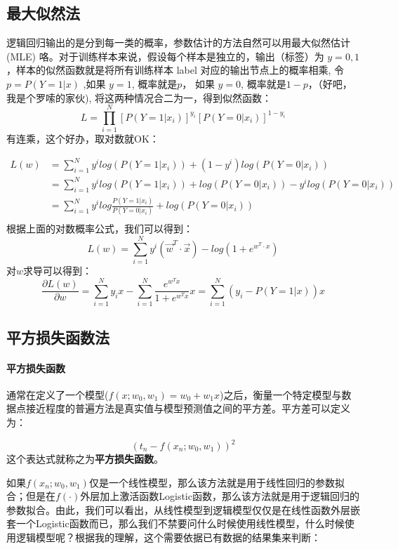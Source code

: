 \documentclass[a4paper, 11pt, hyperref, UTF8]{ctexart} %
\begin{document}
\subsection{最大似然法}

逻辑回归输出的是分到每一类的概率，参数估计的方法自然可以用最大似然估计 (MLE) 咯。对于训练样本来说，假设每个样本是独立的，输出（标签）为 $y = {0, 1}$，样本的似然函数就是将所有训练样本 label 对应的输出节点上的概率相乘, 令 $p = P(Y=1|x)$ ,如果 $y = 1$, 概率就是$ p$， 如果 $y = 0$, 概率就是$ 1 - p $，（好吧，我是个罗嗦的家伙),  将这两种情况合二为一，得到似然函数：
$$ L=\prod_{i=1}^{N}{[P(Y=1|x_i)]^{y_i} [P(Y=0|x_i)]^{1-y_i}} $$
有连乘，这个好办，取对数就OK：

\begin{align*}
 L(w) &= \sum _{i=1} ^{N} {y^i log(P(Y=1|x_i)) + (1-y^i)log(P(Y=0|x_i))} \\
      &= \sum _{i=1} ^{N} {y^i log(P(Y=1|x_i)) + log(P(Y=0|x_i)) - y^ilog(P(Y=0|x_i))} \\
      &= \sum _{i=1} ^{N} {y^i log\frac{P(Y=1|x_i)} {P(Y=0|x_i)} + log(P(Y=0|x_i))} \\
\end{align*}
根据上面的对数概率公式，我们可以得到：
$$ L(w) = \sum _{i=1} ^{N} {y^i (\vec w^T \cdot \vec x ) - log(1 + e^{w^T \cdot x})}$$
对$w$求导可以得到：
$$ \frac {\partial L(w)}{\partial w} = \sum _{i=1} ^{N} {y_ix} - \sum_{i=1}^{N}{\frac{e^{w^Tx}}{1+e^{w^Tx}}x} = \sum _{i=1} ^{N} {(y_i - P(Y=1|x))x}$$

\subsection{平方损失函数法}

\paragraph{平方损失函数}通常在定义了一个模型($f(x;w_0,w_1)=w_0+w_1x$)之后，衡量一个特定模型与数据点接近程度的普遍方法是真实值与模型预测值之间的平方差\cite{rogers2011first}。平方差可以定义为：

$$ {(t_n - f( x_n; w_0, w_1 ))}^2 $$
这个表达式就称之为\textbf{平方损失函数}。

如果$ f(x_n; w_0, w_1) $仅是一个线性模型，那么该方法就是用于线性回归的参数拟合；但是在$ f(\cdot) $外层加上激活函数Logistic函数，那么该方法就是用于逻辑回归的参数拟合。由此，我们可以看出，从线性模型到逻辑模型仅仅是在线性函数外层嵌套一个Logistic函数而已，那么我们不禁要问什么时候使用线性模型，什么时候使用逻辑模型呢？根据我的理解，这个需要依据已有数据的结果集来判断：
\end{document}
